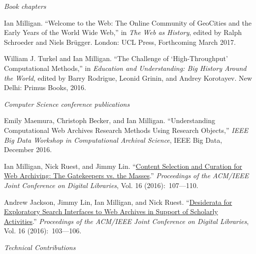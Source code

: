 \documentclass[11pt,article,oneside]{memoir}
\begin{document}
\bigskip

\noindent\emph{Book chapters \vspace{0.05in}}

\ind Ian Milligan. ``Welcome to the Web: The Online Community of GeoCities and the Early Years of the World Wide Web,'' in \emph{The Web as History}, edited by Ralph Schroeder and Niels Br\"ugger. London: UCL Press, Forthcoming March 2017.

\ind William J. Turkel and Ian Milligan. ``The Challenge of `High-Throughput' Computational Methods,'' in \emph{Education and Understanding: Big History Around the World}, edited by Barry Rodrigue, Leonid Grinin, and Andrey Korotayev. New Delhi: Primus Books, 2016.


\bigskip 

\noindent\emph{Computer Science conference publications \vspace{0.05in}}

\ind Emily Maemura, Christoph Becker, and Ian Milligan. ``Understanding Computational Web Archives Research Methods Using Research Objects,'' \emph{IEEE Big Data Workshop in Computational Archival Science}, IEEE Big Data, December 2016. 

\ind Ian Milligan, Nick Ruest, and Jimmy Lin. ``\href{http://dl.acm.org/citation.cfm?id=2910913&CFID=806438388&CFTOKEN=32226772}{Content Selection and Curation for Web Archiving: The Gatekeepers vs. the Masses}.'' \emph{Proceedings of the ACM/IEEE Joint Conference on Digital Libraries}, Vol. 16 (2016):~107---110.

\ind Andrew Jackson, Jimmy Lin, Ian Milligan, and Nick Ruest. ``\href{http://dl.acm.org/citation.cfm?id=2910912&CFID=806438388&CFTOKEN=32226772}{Desiderata for Exploratory Search Interfaces to Web Archives in Support of Scholarly Activities}.'' \emph{Proceedings of the ACM/IEEE Joint Conference on Digital Libraries}, Vol. 16 (2016):~103---106.


\bigskip 

\noindent\emph{Technical Contributions \vspace{0.05in}}
\end{document}
